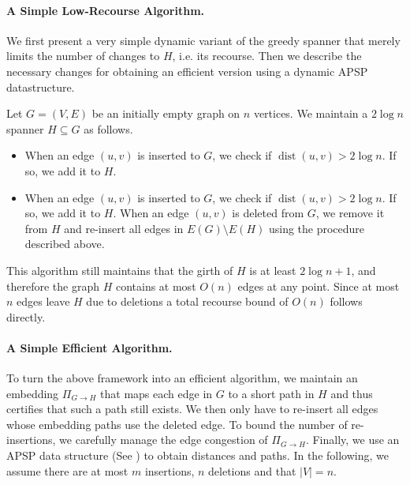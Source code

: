 \documentclass[11pt]{article}
\DeclareMathOperator{\dist}{dist}
\begin{document}
\paragraph{A Simple Low-Recourse Algorithm. }  We first present a very simple dynamic variant of the greedy spanner that merely limits the number of changes to $H$, i.e. its recourse. Then we describe the necessary changes for obtaining an efficient version using a dynamic APSP datastructure. 

Let $G = (V, E)$ be an initially empty graph on $n$ vertices. We maintain a $2 \log n$ spanner $H \subseteq G$ as follows. 
\begin{itemize}
    \item When an edge $(u,v)$ is inserted to $G$, we check if $\dist(u,v) > 2 \log n$. If so, we add it to $H$.
    \item When an edge $(u,v)$ is inserted to $G$, we check if $\dist(u,v) > 2 \log n$. If so, we add it to $H$. When an edge $(u,v)$ is deleted from $G$, we remove it from $H$ and re-insert all edges in $E(G)\setminus E(H)$ using the procedure described above.
\end{itemize}
This algorithm still maintains that the girth of $H$ is at least $2 \log n + 1$, and therefore the graph $H$ contains at most $O(n)$ edges at any point. Since at most $n$ edges leave $H$ due to deletions a total recourse bound of $O(n)$ follows directly. 

\paragraph{A Simple Efficient Algorithm. } To turn the above framework into an efficient algorithm, we maintain an embedding $\Pi_{G \rightarrow H}$ that maps each edge in $G$ to a short path in $H$ and thus certifies that such a path still exists. We then only have to re-insert all edges whose embedding paths use the deleted edge. To bound the number of re-insertions, we carefully manage the edge congestion of $\Pi_{G \rightarrow H}$. Finally, we use an APSP data structure (See ) to obtain distances and paths. In the following, we assume there are at most $m$ insertions, $n$ deletions and that $|V| = n$.
\end{document}
